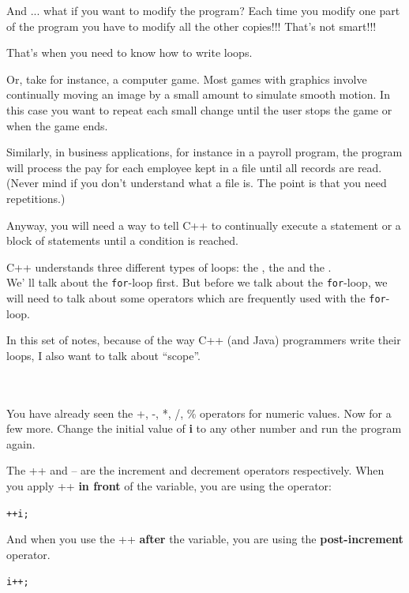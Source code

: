And ... what if you want to modify the program? Each time you modify
one part of the program you have to modify all the other copies!!! That's
not smart!!!

That's when you need to know how to write loops.

Or, take for instance, a computer game. Most games with graphics
involve continually moving an image by a small amount to simulate
smooth motion. In this case you want to repeat each small change until
the user stops the game or when the game ends.

Similarly, in business applications, for instance in a payroll program, the
program will process the pay for each employee kept in a file until all
records are read. (Never mind if you don't understand what a file is. The
point is that you need repetitions.)

Anyway, you will need a way to tell C++ to continually execute a
statement or a block of statements until a condition is reached.

C++ understands three different types of loops: the , the  and the .\\
We' ll talk about the \texttt{for}-loop first. But before we talk about the \texttt{for}-loop, we will need to talk about some operators which are frequently used with the \texttt{for}-loop.

In this set of notes, because of the way C++ (and Java) programmers write their loops, I also want to talk about ``scope''.

\newpage{}\\\\
You have already seen the +, -, *, /, \% operators for numeric values.
Now for a few more.
Change the initial value of \textbf{i} to any other number and run the program again.

The ++ and -- are the increment and decrement operators respectively. When you apply ++ \textbf{in front} of the variable, you are using the  operator:\\
\begin{center}
  \texttt{++i;}
\end{center}

And when you use the ++ \textbf{after} the variable, you are using the \textbf{post-increment} operator.
\begin{center}
  \texttt{i++;}
\end{center}


